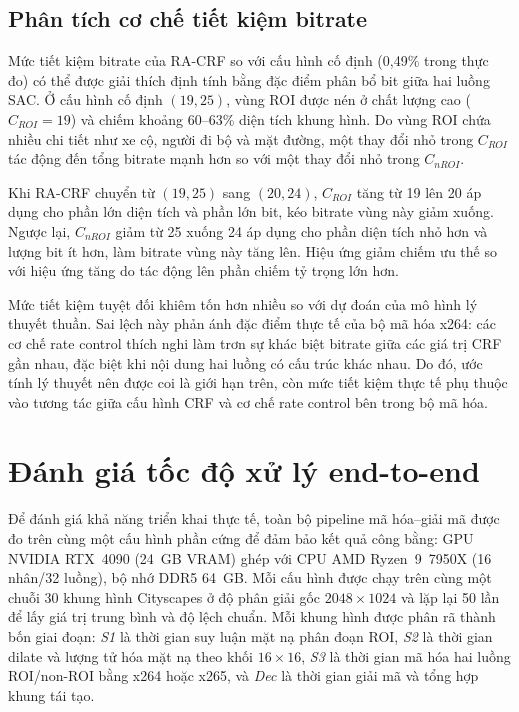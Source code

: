\subsection{Phân tích cơ chế tiết kiệm bitrate}

Mức tiết kiệm bitrate của RA-CRF so với cấu hình cố định (0,49\% trong thực đo) có thể được giải thích định tính bằng đặc điểm phân bổ bit giữa hai luồng SAC. Ở cấu hình cố định $(19,25)$, vùng ROI được nén ở chất lượng cao ($C_{ROI}=19$) và chiếm khoảng 60--63\% diện tích khung hình. Do vùng ROI chứa nhiều chi tiết như xe cộ, người đi bộ và mặt đường, một thay đổi nhỏ trong $C_{ROI}$ tác động đến tổng bitrate mạnh hơn so với một thay đổi nhỏ trong $C_{nROI}$.

Khi RA-CRF chuyển từ $(19,25)$ sang $(20,24)$, $C_{ROI}$ tăng từ 19 lên 20 áp dụng cho phần lớn diện tích và phần lớn bit, kéo bitrate vùng này giảm xuống. Ngược lại, $C_{nROI}$ giảm từ 25 xuống 24 áp dụng cho phần diện tích nhỏ hơn và lượng bit ít hơn, làm bitrate vùng này tăng lên. Hiệu ứng giảm chiếm ưu thế so với hiệu ứng tăng do tác động lên phần chiếm tỷ trọng lớn hơn.

Mức tiết kiệm tuyệt đối khiêm tốn hơn nhiều so với dự đoán của mô hình lý thuyết thuần. Sai lệch này phản ánh đặc điểm thực tế của bộ mã hóa x264: các cơ chế rate control thích nghi làm trơn sự khác biệt bitrate giữa các giá trị CRF gần nhau, đặc biệt khi nội dung hai luồng có cấu trúc khác nhau. Do đó, ước tính lý thuyết nên được coi là giới hạn trên, còn mức tiết kiệm thực tế phụ thuộc vào tương tác giữa cấu hình CRF và cơ chế rate control bên trong bộ mã hóa.

\section{Đánh giá tốc độ xử lý end-to-end}
\label{sec:e2e-latency}

Để đánh giá khả năng triển khai thực tế, toàn bộ pipeline mã hóa--giải mã được đo trên cùng một cấu hình phần cứng để đảm bảo kết quả công bằng: GPU NVIDIA RTX~4090 (24~GB VRAM) ghép với CPU AMD Ryzen~9~7950X (16 nhân/32 luồng), bộ nhớ DDR5 64~GB. Mỗi cấu hình được chạy trên cùng một chuỗi 30 khung hình Cityscapes ở độ phân giải gốc $2048\times1024$ và lặp lại 50 lần để lấy giá trị trung bình và độ lệch chuẩn. Mỗi khung hình được phân rã thành bốn giai đoạn: \textit{S1} là thời gian suy luận mặt nạ phân đoạn ROI, \textit{S2} là thời gian dilate và lượng tử hóa mặt nạ theo khối $16\times16$, \textit{S3} là thời gian mã hóa hai luồng ROI/non-ROI bằng x264 hoặc x265, và \textit{Dec} là thời gian giải mã và tổng hợp khung tái tạo.

